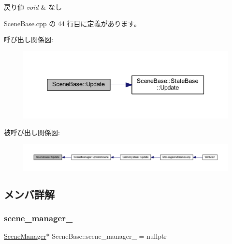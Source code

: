 \begin{DoxyRetVals}{戻り値}
{\em void} & なし \\
\hline
\end{DoxyRetVals}


 Scene\+Base.\+cpp の 44 行目に定義があります。

呼び出し関係図\+:
\nopagebreak
\begin{figure}[H]
\begin{center}
\leavevmode
\includegraphics[width=339pt]{class_scene_base_a71f332a32d99548b3aa912210a2dd0b0_cgraph}
\end{center}
\end{figure}
被呼び出し関係図\+:
\nopagebreak
\begin{figure}[H]
\begin{center}
\leavevmode
\includegraphics[width=350pt]{class_scene_base_a71f332a32d99548b3aa912210a2dd0b0_icgraph}
\end{center}
\end{figure}


\subsection{メンバ詳解}
\mbox{\label{class_scene_base_af9f693449ce2472d28f692bd64d5c2ef}} 
\subsubsection{\texorpdfstring{scene\+\_\+manager\+\_\+}{scene\_manager\_}}
{\footnotesize\ttfamily \mbox{\hyperlink{class_scene_manager}{Scene\+Manager}}$\ast$ Scene\+Base\+::scene\+\_\+manager\+\_\+ = nullptr\hspace{0.3cm}{\ttfamily [private]}}



